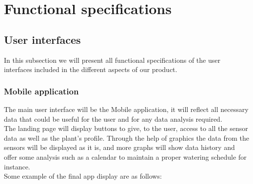 \section{Functional specifications}

\subsection{User interfaces}
In this subsection we will present all functional specifications of the user interfaces
included in the different aspects of our product.

\subsubsection{Mobile application}
The main user interface will be the Mobile application, it will reflect all necessary
data that could be useful for the user and for any data analysis required. \\
The landing page will display buttons to give, to the user, access to all the sensor
data as well as the plant's profile. Through the help of graphics the data from
the sensors will be displayed as it is, and more graphs will show data history and
offer some analysis such as a calendar to maintain a proper watering schedule for instance. \\
Some example of the final app display are as follows:

